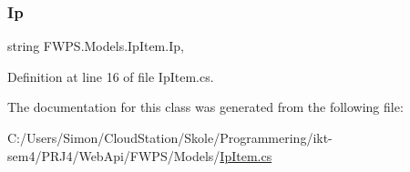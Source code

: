\subsubsection{\texorpdfstring{Ip}{Ip}}
{\footnotesize\ttfamily string F\+W\+P\+S.\+Models.\+Ip\+Item.\+Ip\hspace{0.3cm}{\ttfamily [get]}, {\ttfamily [set]}}



Definition at line 16 of file Ip\+Item.\+cs.



The documentation for this class was generated from the following file\+:\begin{DoxyCompactItemize}
\item 
C\+:/\+Users/\+Simon/\+Cloud\+Station/\+Skole/\+Programmering/ikt-\/sem4/\+P\+R\+J4/\+Web\+Api/\+F\+W\+P\+S/\+Models/\mbox{\hyperlink{_ip_item_8cs}{Ip\+Item.\+cs}}\end{DoxyCompactItemize}
